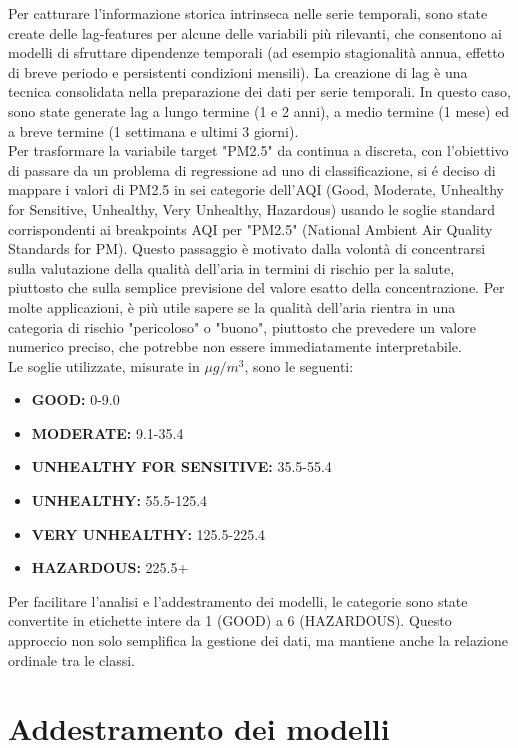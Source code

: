 \documentclass[a4paper,12pt]{report}
\begin{document}
	Per catturare l'informazione storica intrinseca nelle serie temporali, sono state create delle lag-features per alcune delle variabili più rilevanti, che consentono ai modelli di sfruttare dipendenze temporali (ad esempio stagionalità annua, effetto di breve periodo e persistenti condizioni mensili). La creazione di lag è una tecnica consolidata nella preparazione dei dati per serie temporali. In questo caso, sono state generate lag a lungo termine (1 e 2 anni), a medio termine (1 mese) ed a breve termine (1 settimana e ultimi 3 giorni). \\
	Per trasformare la variabile target "PM2.5" da continua a discreta, con l'obiettivo di passare da un problema di regressione ad uno di classificazione, si é deciso di mappare i valori di PM2.5 in sei categorie dell'AQI (Good, Moderate, Unhealthy for Sensitive, Unhealthy, Very Unhealthy, Hazardous) usando le soglie standard corrispondenti ai breakpoints AQI per "PM2.5" (National Ambient Air Quality Standards for PM). Questo passaggio è motivato dalla volontà di concentrarsi sulla valutazione della qualità dell'aria in termini di rischio per la salute, piuttosto che sulla semplice previsione del valore esatto della concentrazione. Per molte applicazioni, è più utile sapere se la qualità dell'aria rientra in una categoria di rischio "pericoloso" o "buono", piuttosto che prevedere un valore numerico preciso, che potrebbe non essere immediatamente interpretabile.\\
	Le soglie utilizzate, misurate in $\mu g/m^3$, sono le seguenti:
	\begin{itemize}
		\item \textbf{GOOD:} 0-9.0
		\item \textbf{MODERATE:} 9.1-35.4
		\item \textbf{UNHEALTHY FOR SENSITIVE:} 35.5-55.4
		\item \textbf{UNHEALTHY:} 55.5-125.4
		\item \textbf{VERY UNHEALTHY:} 125.5-225.4
		\item \textbf{HAZARDOUS:} 225.5+
	\end{itemize}
	Per facilitare l'analisi e l'addestramento dei modelli, le categorie sono state convertite in etichette intere da 1 (GOOD) a 6 (HAZARDOUS). Questo approccio non solo semplifica la gestione dei dati, ma mantiene anche la relazione ordinale tra le classi.
	
	\section{Addestramento dei modelli}
	
\end{document}
